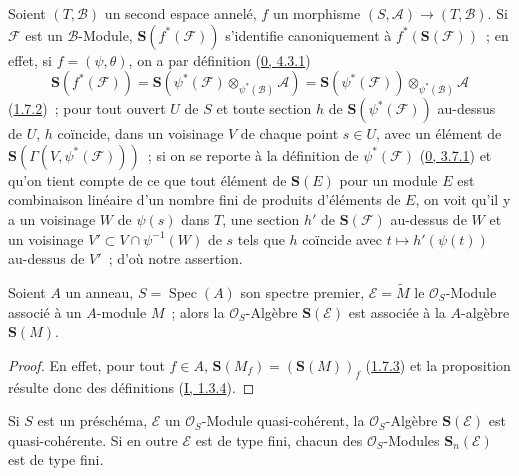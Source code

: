 \begin{env}[1.7.5]
\label{II.1.7.5-fr}
Soient $(T,\mathcal{B})$ un second espace annelé, $f$ un morphisme
$(S,\mathcal{A})\to(T,\mathcal{B})$. Si $\mathcal{F}$ est un
$\mathcal{B}$-Module, $\mathbf{S}(f^*(\mathcal{F}))$ s'identifie
canoniquement à $f^*(\mathbf{S}(\mathcal{F}))$~; en effet, si
$f=(\psi,\theta)$, on a par définition
(\hyperref[0.4.3.1-fr]{0, 4.3.1})
\[
  \mathbf{S}(f^*(\mathcal{F}))
  =\mathbf{S}(\psi^*(\mathcal{F})
    \otimes_{\psi^*(\mathcal{B})}\mathcal{A})
  =\mathbf{S}(\psi^*(\mathcal{F}))
    \otimes_{\psi^*(\mathcal{B})}\mathcal{A}
\]
(\hyperref[II.1.7.2-fr]{1.7.2})~; pour tout ouvert $U$ de $S$ et toute
section $h$ de $\mathbf{S}(\psi^*(\mathcal{F}))$ au-dessus de $U$, $h$
coïncide, dans un voisinage $V$ de chaque point $s\in U$, avec un élément de
$\mathbf{S}(\Gamma(V,\psi^*(\mathcal{F})))$~; si on se reporte à la
définition de $\psi^*(\mathcal{F})$
(\hyperref[0.3.7.1-fr]{0, 3.7.1}) et qu'on tient compte de ce que tout élément
de $\mathbf{S}(E)$ pour un module $E$ est combinaison linéaire d'un nombre
fini de produits d'éléments de $E$, on voit qu'il y a un voisinage $W$ de
$\psi(s)$ dans $T$, une section $h'$ de $\mathbf{S}(\mathcal{F})$ au-dessus
de $W$ et un voisinage $V'\subset V\cap\psi^{-1}(W)$ de $s$ tels que $h$
coïncide avec $t\mapsto h'(\psi(t))$ au-dessus de $V'$~; d'où notre
assertion.
\end{env}

\begin{proposition}[1.7.6]
\label{II.1.7.6-fr}
Soient $A$ un anneau, $S=\operatorname{Spec}(A)$ son spectre premier,
$\mathcal{E}=\widetilde{M}$ le $\mathcal{O}_S$-Module associé à un $A$-module
$M$~; alors la $\mathcal{O}_S$-Algèbre $\mathbf{S}(\mathcal{E})$ est associée
à la $A$-algèbre $\mathbf{S}(M)$.
\end{proposition}

\begin{proof}
En effet, pour tout $f\in A$,
$\mathbf{S}(M_f)=(\mathbf{S}(M))_f$
(\hyperref[II.1.7.3-fr]{1.7.3}) et la proposition résulte donc des définitions
(\hyperref[I.1.3.4-fr]{I, 1.3.4}).
\end{proof}

\begin{corollary}[1.7.7]
\label{II.1.7.7-fr}
Si $S$ est un préschéma, $\mathcal{E}$ un $\mathcal{O}_S$-Module
quasi-cohérent, la $\mathcal{O}_S$-Algèbre $\mathbf{S}(\mathcal{E})$ est
quasi-cohérente. Si en outre $\mathcal{E}$ est de type fini, chacun des
$\mathcal{O}_S$-Modules $\mathbf{S}_n(\mathcal{E})$ est de type fini.
\end{corollary}

